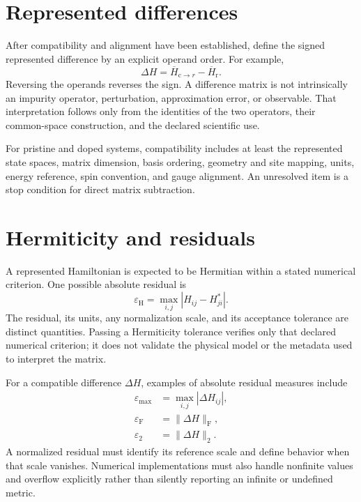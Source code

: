 \section{Represented differences}


After compatibility and alignment have been established, define the signed
represented difference by an explicit operand order. For example,
\begin{equation}
  \Delta H
  =
  \overline H_{\mathrm c\rightarrow r}
  -
  \overline H_{\mathrm r}.
\end{equation}
Reversing the operands reverses the sign. A difference matrix is not
intrinsically an impurity operator, perturbation, approximation error, or
observable. That interpretation follows only from the identities of the two
operators, their common-space construction, and the declared scientific use.

For pristine and doped systems, compatibility includes at least the represented
state spaces, matrix dimension, basis ordering, geometry and site mapping,
units, energy reference, spin convention, and gauge alignment. An unresolved
item is a stop condition for direct matrix subtraction.

\section{Hermiticity and residuals}


A represented Hamiltonian is expected to be Hermitian within a stated numerical
criterion. One possible absolute residual is
\begin{equation}
  \varepsilon_{\mathrm H}
  =
  \max_{i,j}\left|H_{ij}-H_{ji}^{*}\right|.
\end{equation}
The residual, its units, any normalization scale, and its acceptance tolerance
are distinct quantities. Passing a Hermiticity tolerance verifies only that
declared numerical criterion; it does not validate the physical model or the
metadata used to interpret the matrix.

For a compatible difference $\Delta H$, examples of absolute residual measures
include
\begin{align}
  \varepsilon_{\max} &= \max_{i,j}|\Delta H_{ij}|,\\
  \varepsilon_{\mathrm F} &= \|\Delta H\|_{\mathrm F},\\
  \varepsilon_{2} &= \|\Delta H\|_{2}.
\end{align}
A normalized residual must identify its reference scale and define behavior
when that scale vanishes. Numerical implementations must also handle nonfinite
values and overflow explicitly rather than silently reporting an infinite or
undefined metric.

